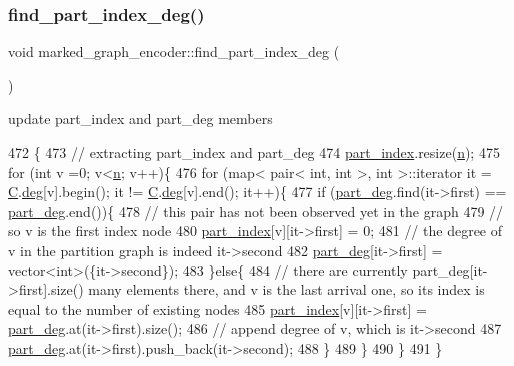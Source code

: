 \subsubsection{\texorpdfstring{find\+\_\+part\+\_\+index\+\_\+deg()}{find\_part\_index\_deg()}}
{\footnotesize\ttfamily void marked\+\_\+graph\+\_\+encoder\+::find\+\_\+part\+\_\+index\+\_\+deg (\begin{DoxyParamCaption}{ }\end{DoxyParamCaption})\hspace{0.3cm}{\ttfamily [private]}}



update part\+\_\+index and part\+\_\+deg members 


\begin{DoxyCode}
472 \{
473   \textcolor{comment}{// extracting part\_index and part\_deg}
474   \hyperlink{classmarked__graph__encoder_a1d3e2b90f5d46244fd4cb33c69ac81f1}{part\_index}.resize(\hyperlink{classmarked__graph__encoder_a4c66d9fdbc14c97523715aac7e4511cb}{n});
475   \textcolor{keywordflow}{for} (\textcolor{keywordtype}{int} v =0; v<\hyperlink{classmarked__graph__encoder_a4c66d9fdbc14c97523715aac7e4511cb}{n}; v++)\{
476     \textcolor{keywordflow}{for} (map< pair< int, int >, \textcolor{keywordtype}{int} >::iterator it = \hyperlink{classmarked__graph__encoder_af82bc0653414091291cb75553a407bdb}{C}.\hyperlink{classcolored__graph_ae3269d35c1b022bc70d195bebd4e1b8a}{deg}[v].begin(); it != 
      \hyperlink{classmarked__graph__encoder_af82bc0653414091291cb75553a407bdb}{C}.\hyperlink{classcolored__graph_ae3269d35c1b022bc70d195bebd4e1b8a}{deg}[v].end(); it++)\{
477       \textcolor{keywordflow}{if} (\hyperlink{classmarked__graph__encoder_a55ea2edb2609dfc287432f61900d6ad1}{part\_deg}.find(it->first) == \hyperlink{classmarked__graph__encoder_a55ea2edb2609dfc287432f61900d6ad1}{part\_deg}.end())\{
478         \textcolor{comment}{// this pair has not been observed yet in the graph}
479         \textcolor{comment}{// so v is the first index node}
480         \hyperlink{classmarked__graph__encoder_a1d3e2b90f5d46244fd4cb33c69ac81f1}{part\_index}[v][it->first] = 0;
481         \textcolor{comment}{// the degree of v in the partition graph is indeed it->second}
482         \hyperlink{classmarked__graph__encoder_a55ea2edb2609dfc287432f61900d6ad1}{part\_deg}[it->first] = vector<int>(\{it->second\}); 
483       \}\textcolor{keywordflow}{else}\{
484         \textcolor{comment}{// there are currently part\_deg[it->first].size() many elements there, and v is the last arrival
       one, so its index is equal to the number of existing nodes }
485         \hyperlink{classmarked__graph__encoder_a1d3e2b90f5d46244fd4cb33c69ac81f1}{part\_index}[v][it->first] = \hyperlink{classmarked__graph__encoder_a55ea2edb2609dfc287432f61900d6ad1}{part\_deg}.at(it->first).size();
486         \textcolor{comment}{// append degree of v, which is it->second}
487         \hyperlink{classmarked__graph__encoder_a55ea2edb2609dfc287432f61900d6ad1}{part\_deg}.at(it->first).push\_back(it->second); 
488       \}
489     \}
490   \}
491 \}
\end{DoxyCode}


